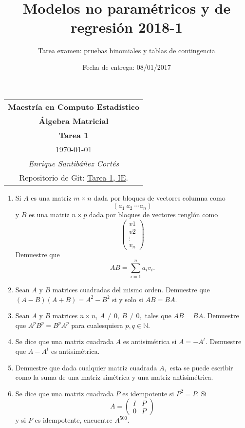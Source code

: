 \documentclass[11pt,letterpaper]{article}
\title{Modelos no paramétricos y de regresión 2018-1}
\author{Tarea examen: pruebas binomiales y tablas de contingencia}
\date{Fecha de entrega: 08/01/2017}
\begin{document}
\begin{table}[ht]
\centering
\begin{tabular}{c}
\textbf{Maestría en Computo Estadístico}\\
\textbf{Álgebra Matricial} \\
\textbf{Tarea 1}\\
\today \\
\emph{Enrique Santibáñez Cortés}\\
Repositorio de Git: \href{https://github.com/Enriquesec/Inferencia_Estad-stica/tree/master/Tareas/Tarea_1}{Tarea 1, IE}.
\end{tabular}
\end{table}

\begin{enumerate}
\item Si $A$ es una matriz $m\times n$ dada por bloques de vectores columna como $$ (a_1\ a_2\ \cdots a_n)$$ y $B$ es una matriz $n\times p$ dada por bloques de vectores renglón como
\begin{equation*}
\left(\begin{array}{c}
v1\\
v2\\
\vdots \\
v_n
\end{array}
\right)
\end{equation*}
Demuestre que $$AB=\sum_{i=1}^na_iv_i.$$

\item Sean $A$ y $B$ matrices cuadradas del mismo orden. Demuestre que $(A-B)(A+B)=A^2-B^2$ si y solo si $AB=BA.$

\item Sean $A$ y $B$ matrices $n\times n$, $A\neq 0, \ B\neq 0,$ tales que $AB=BA.$ Demuestre que $A^pB^p=B^pA^p$ para cualesquiera $p,q\in \mathbb{N}.$

\item Se dice que una matriz cuadrada $A$ es antisimétrica si $A=-A^t.$ Demuestre que $A-A^t$ es antisimétrica.

\item Demuestre que dada cualquier matriz cuadrada $A,$ esta se puede escribir como la suma de una matriz simétrica y una matriz antisimétrica.

\item Se dice que una matriz cuadrada $P$ es idempotente si $P^2=P$. Si 
\begin{equation*}
A=\left(\begin{array}{cc}
I& P\\
0&P
\end{array}
\right)
\end{equation*}
y si $P$ es idempotente, encuentre $A^{500}.$


\end{enumerate}
\end{document}
